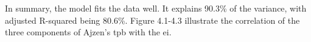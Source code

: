 In summary, the model fits the data well. It explains 90.3\% of the variance, with adjusted R-squared being 80.6\%. Figure 4.1-4.3 illustrate the correlation of the three components of Ajzen's \ac{tpb} with the \ac{ei}.  

\begin{figure}[H]
\end{figure}

\begin{figure}[H]
\end{figure}

\begin{figure}[H]
\end{figure}

